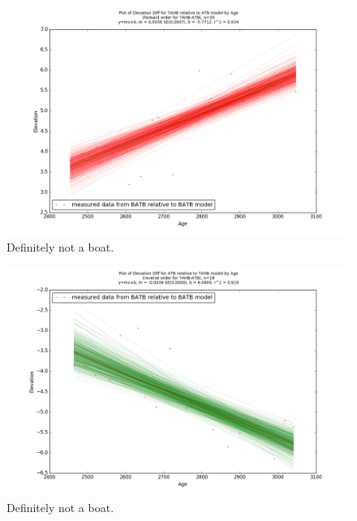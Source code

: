 \documentclass{article}
\begin{document}
\begin{figure}[h]
	\includegraphics[width=\linewidth]{data/gias/theGIA_TAHB_relative_to_ATB.png}
	\caption{Definitely not a boat.}
	\label{fig:gias_TAHBxATB}
\end{figure}
\newpage


\begin{figure}[h]
	\includegraphics[width=\linewidth]{data/gias/theGIA_ATB_relative_to_TAHB.png}
	\caption{Definitely not a boat.}
	\label{fig:gias_ATBxTAHB}
\end{figure}
\newpage
\end{document}
